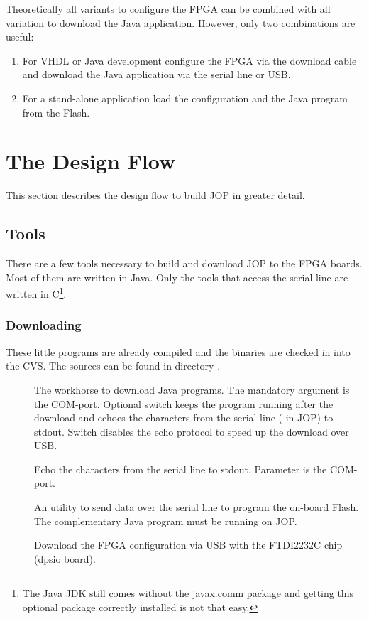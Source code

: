 Theoretically all variants to configure the FPGA can be combined
with all variation to download the Java application. However, only
two combinations are useful:

\begin{enumerate}
    \item For VHDL or Java development configure the FPGA
    via the download cable and download the Java application
    via the serial line or USB.
    \item For a stand-alone application load the configuration and
    the Java program from the Flash.
\end{enumerate}



\section{The Design Flow}

This section describes the design flow to build JOP in greater
detail.

\subsection{Tools}

There are a few tools necessary to build and download JOP to the
FPGA boards. Most of them are written in Java. Only the tools that
access the serial line are written in C\footnote{The Java JDK still
comes without the javax.comm package and getting this optional
package correctly installed is not that easy.}.

\subsubsection{Downloading}

These little programs are already compiled and the binaries are
checked in into the CVS. The sources can be found in directory
.

\begin{description}
    \item[] The workhorse to download Java programs. The
    mandatory argument is the COM-port. Optional switch 
    keeps the program running after the download and echoes the
    characters from the serial line ( in JOP) to
    stdout. Switch  disables the echo protocol to speed up the
    download over USB.
    \item[] Echo the characters from the serial line to stdout.
    Parameter is the COM-port.
    \item[] An utility to send data over the serial line to program
    the on-board Flash. The complementary Java program
     must be running on JOP.
    \item[] Download the FPGA configuration via
    USB with the FTDI2232C chip (dpsio board).
\end{description}

